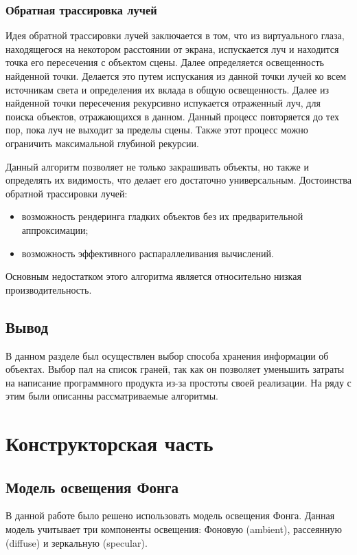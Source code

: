 \documentclass[12pt]{report}
\begin{document}
	\subsection{Обратная трассировка лучей}
	Идея обратной трассировки лучей заключается в том, что из виртуального глаза, находящегося на некотором расстоянии от экрана, испускается луч и находится точка его пересечения с объектом сцены. Далее определяется освещенность найденной точки. Делается это путем испускания из данной точки лучей ко всем источникам света и определения их вклада в общую освещенность. Далее из найденной точки пересечения рекурсивно испукается отраженный луч, для поиска объектов, отражающихся в данном. Данный процесс повторяется до тех пор, пока луч не выходит за пределы сцены. Также этот процесс можно ограничить максимальной глубиной рекурсии. 
	
	Данный алгоритм позволяет не только закрашивать объекты, но также и определять их видимость, что делает его достаточно универсальным.
	Достоинства обратной трассировки лучей:
	\begin{itemize}
		\item возможность рендеринга гладких объектов без их предварительной аппроксимации;
		\item возможность эффективного распараллеливания вычислений.
	\end{itemize}

	Основным недостатком этого алгоритма является относительно низкая производительность.
	
	\section*{Вывод}
	
	В данном разделе был осуществлен выбор способа хранения информации об объектах. Выбор пал на список граней, так как он позволяет уменьшить затраты на написание программного продукта из-за простоты своей реализации. На ряду с этим были описанны рассматриваемые алгоритмы.
	
	\chapter{Конструкторская часть}
	\section{Модель освещения Фонга}
	
	В данной работе было решено использовать модель освещения Фонга. Данная модель учитывает три компоненты освещения: Фоновую (ambient), рассеянную (diffuse) и зеркальную (specular).
		
\end{document}
